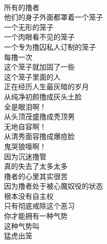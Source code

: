 \begin{poem}[无形的笼子]
    \begin{multicols}{3}
        \centering~\\
        所有的撸者 \\ 他们的身子外面都罩着一个笼子 \\ 一个无形的笼子 \\ 一个肉眼看不见的笼子 \\ 一个专为撸囚私人订制的笼子 \\ 每撸一次 \\ 这个笼子就加固了一些 \\ 这个笼子里面的人 \\ 正在经历人生最灰暗的岁月 \\ 从纯净初颜撸成灰头土脸 \\ 全是眼泪啊！ \\ 从头顶茂盛撸成秃顶男 \\ 无地自容啊！ \\ 从清秀面容撸成爆痘脸 \\ 鬼哭狼嚎啊！ \\ 因为沉迷撸管 \\ 真的失去了太多太多 \\ 撸者的心里其实很苦 \\ 因为撸者处于被心魔奴役的状态 \\ 根本没有自主权 \\ 只有彻底戒除这个恶习 \\ 你才能拥有一种气势 \\ 这种气势叫 \\ 猛虎出笼
    \end{multicols}
\end{poem}

